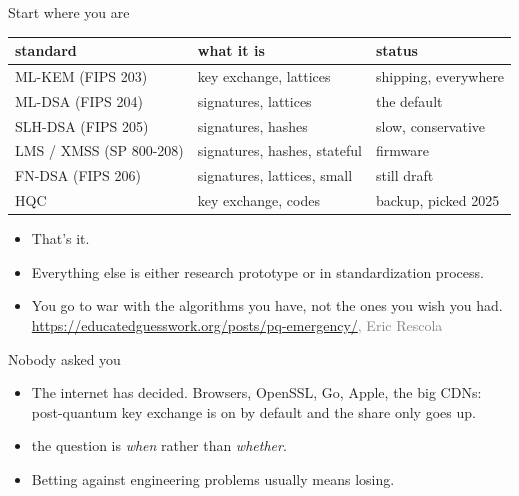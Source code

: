 \documentclass[aspectratio=169,handout]{beamer}
\newcommand{\cgood}[1]{\textcolor{good}{#1}}
\newcommand{\cwarm}[1]{\textcolor{warm}{#1}}
\newcommand{\cgrey}[1]{\textcolor{grey}{#1}}
\begin{document}
          \begin{frame}{Start where you are}
  \centering\footnotesize
  \begin{tabular}{@{}l l l@{}}
    \toprule
    \textbf{standard} & \textbf{what it is} & \textbf{status} \\
    \midrule
    ML-KEM (FIPS 203) & key exchange, lattices & \cgood{shipping, everywhere} \\
    ML-DSA (FIPS 204) & signatures, lattices & \cgood{the default} \\
    SLH-DSA (FIPS 205) & signatures, hashes & \cgood{slow, conservative} \\
    LMS / XMSS (SP 800-208) & signatures, hashes, stateful & \cgood{firmware} \\
    FN-DSA (FIPS 206) & signatures, lattices, small & \cwarm{still draft} \\
    HQC & key exchange, codes & \cwarm{backup, picked 2025} \\
    \bottomrule
  \end{tabular}
  \vspace{3mm}
  \begin{itemize}
    \item<2-> That's it. 
    \item<3-> Everything else is either research
      prototype or in standardization process. 
    \item<4->  \alert{You go to war with the algorithms you have, not the ones you wish you had. } \\ \cgrey{\url{https://educatedguesswork.org/posts/pq-emergency/}, Eric Rescola}
  \end{itemize}
\end{frame}

\begin{frame}{Nobody asked you}
  \begin{itemize}
    \item<1-> The internet has decided. Browsers, OpenSSL, Go, Apple,
      the big CDNs: post-quantum key exchange is on by default and
      the share only goes up.
    \item<2->  the question is \emph{when} rather than \emph{whether}.
    \item<3-> \alert{Betting against engineering problems usually means losing.} 
  \end{itemize}
\end{frame}
\end{document}
